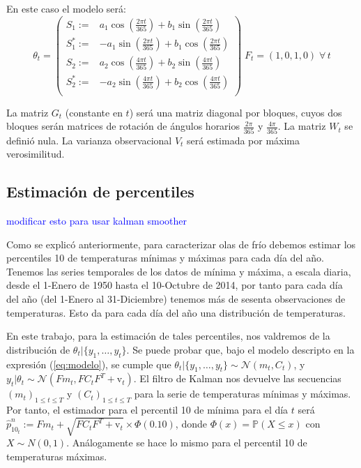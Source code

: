 \documentclass[12pt]{article}\usepackage[]{graphicx}\usepackage[]{color}
\newcommand{\p}{\mathbb{P}}
\begin{document}
En este caso el modelo será:
$$\theta_t=\left(\begin{array}{lr}
S_1:=& a_1\cos\left(\frac{2\pi t}{365}\right) + b_1 \sin\left(\frac{2\pi t}{365}\right) \\
S_1^*:=& -a_1\sin\left(\frac{2\pi t}{365}\right) + b_1 \cos\left(\frac{2\pi t}{365}\right) \\
S_2:= &a_2\cos\left(\frac{4\pi t}{365}\right) + b_2 \sin\left(\frac{4\pi t}{365}\right) \\
S_2^*:=& -a_2\sin\left(\frac{4\pi t}{365}\right) + b_2 \cos\left(\frac{4\pi t}{365}\right) \\
\end{array}\right)\; F_t=(1,0,1,0) \; \forall \, t$$

La matriz $G_t$ (constante en $t$) será una matriz diagonal por bloques, cuyos dos bloques serán matrices de rotación de ángulos horarios $\frac{2\pi}{365}$ y $\frac{4\pi}{365}$. La matriz $W_t$ se definió nula. La varianza observacional $V_t$ será estimada por máxima verosimilitud.

\subsection{Estimación de percentiles}
\textcolor{blue}{modificar esto para usar kalman smoother} 

Como se explicó anteriormente, para caracterizar olas de frío debemos estimar los percentiles 10 de temperaturas mínimas y máximas para cada día del año. Tenemos las series temporales de los datos de mínima y máxima, a escala diaria, desde el 1-Enero de 1950 hasta el 10-Octubre de 2014, por tanto para cada día del año (del 1-Enero al 31-Diciembre) tenemos más de sesenta observaciones de temperaturas. Esto da para cada día del año una distribución de temperaturas.  %

En este trabajo, para la estimación de tales percentiles, nos valdremos de la distribución de $\theta_t | \{y_1,\dots,y_t\}$. Se puede probar que, bajo el modelo descripto en la expresión (\ref{eq:modelo}), se cumple que $\theta_t | \{y_1,\dots,y_t\} \sim \mathcal{N}(m_t,C_t)$, y $y_t|\theta_t \sim \mathcal{N}(Fm_t,FC_tF^T + \text{v}_t)$. El filtro de Kalman nos devuelve las secuencias $(m_t)_{1\leq t \leq T}$ y $(C_t)_{1\leq t \leq T}$ para la serie de temperaturas mínimas y máximas. Por tanto, el estimador para el percentil 10 de mínima para el día $t$ será $\hat{p}^n_{10_t}:=Fm_t+\sqrt{FC_tF^T + \text{v}_t}\times \Phi(0.10)$, donde $\Phi(x)=\p(X\leq x)$ con $X\sim N(0,1)$. Análogamente se hace lo mismo para el percentil 10 de temperaturas máximas.
\end{document}
